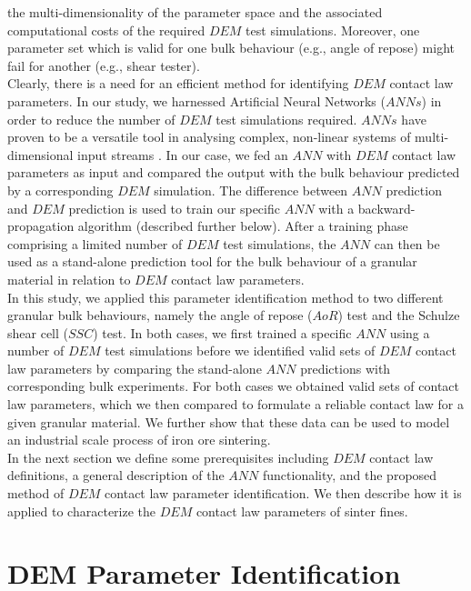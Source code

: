 \documentclass{CFD2015}
\begin{document}
the multi-dimensionality of the parameter space and the associated computational costs of the required 
$DEM$ test simulations. 
Moreover, one parameter set which is valid for one bulk behaviour (e.g., angle
of repose) might fail for another (e.g., shear tester). \\
Clearly, there is a need for an efficient method for identifying
$DEM$ contact law parameters.
In our study, we harnessed Artificial Neural Networks ($ANNs$) in order to
reduce the number of $DEM$ test simulations required. 
$ANNs$ have proven to be a versatile tool in analysing complex, non-linear
systems of multi-dimensional input streams 
\cite{RefWorks:150}.
In our case, we fed an $ANN$ with $DEM$ contact law parameters as input
and compared the output with the bulk behaviour 
predicted by a corresponding $DEM$ simulation. 
The difference between $ANN$ prediction and $DEM$ prediction is used to train our 
specific $ANN$ with a backward-propagation algorithm (described further below). 
After a training phase comprising a limited number of $DEM$ test simulations,
the $ANN$ can then be used as a stand-alone prediction tool for the bulk behaviour of a 
granular material in relation to $DEM$ contact law parameters. \\
In this study, we applied this parameter identification method to two different
granular bulk behaviours, namely the angle of repose ($AoR$) test and the
Schulze shear cell ($SSC$) test.
In both cases, we first trained a specific $ANN$ using a number of $DEM$ test
simulations before we identified valid sets of $DEM$ contact law parameters by
comparing the stand-alone $ANN$ predictions with corresponding bulk experiments. 
For both cases we obtained valid sets of contact law parameters, 
which we then compared to formulate a reliable contact law for a given
granular material.
We further show that these data can be used to model an industrial scale process
of iron ore sintering. \\
In the next section we define some prerequisites including $DEM$ contact law
definitions, a general description of the $ANN$ functionality, and the proposed
method of $DEM$ contact law parameter identification.
We then describe how it is applied to characterize the $DEM$ contact law
parameters of sinter fines.

\section{DEM Parameter Identification}
\label{sec:methodology}
\end{document}

